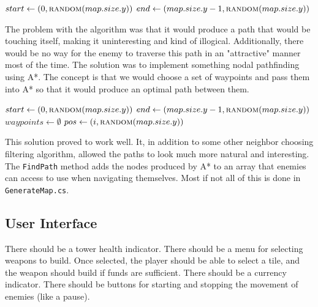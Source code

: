 \documentclass{article}
\begin{document}
\vspace{5mm}

\begin{algorithmic}
    \State $start \gets (0, \Call{random}{map.size.y})$
    \State $end \gets (map.size.y - 1, \Call{random}{map.size.y})$
    \State {}
    \EndProcedure
\end{algorithmic}

The problem with the algorithm was that it would produce a path that would be touching itself, making it uninteresting and kind of illogical. Additionally, there would be no way for the enemy to traverse this path in an "attractive" manner most of the time. The solution was to implement something nodal pathfinding using A*. The concept is that we would choose a set of waypoints and pass them into A* so that it would produce an optimal path between them.

\vspace{5mm}

\begin{algorithmic}
    \State $start \gets (0, \Call{random}{map.size.y})$
    \State $end \gets (map.size.y - 1, \Call{random}{map.size.y})$
    \State $waypoints \gets \emptyset$
    \State {}
    \State $pos \gets (i, \Call{random}{map.size.y})$
    \State {}
    \EndFor
    \State {}
    \State {}
    \EndFor
    \EndProcedure
\end{algorithmic}

This solution proved to work well. It, in addition to some other neighbor choosing filtering algorithm, allowed the paths to look much more natural and interesting. The \lstinline{FindPath} method adds the nodes produced by A* to an array that enemies can access to use when navigating themselves. Most if not all of this is done in \lstinline{GenerateMap.cs}.

\subsection{User Interface}

\begin{displayquote}
    \small
    There should be a tower health indicator. There should be a menu for selecting weapons to build. Once selected, the player should be able to select a tile, and the weapon should build if funds are sufficient. There should be a currency indicator. There should be buttons for starting and stopping the movement of enemies (like a pause).
\end{displayquote}
\end{document}
